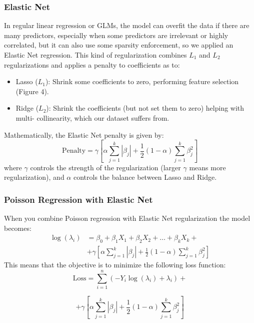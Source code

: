 \documentclass[a4paper, 11pt]{article}
\begin{document}
\begin{multicols}{2}
{\subsubsection*{Elastic Net}
In regular linear regression or GLMs, the model can overfit the data if there are many predictors, especially when some predictors are irrelevant or highly correlated, but it can also use some sparsity enforcement, so we applied an Elastic Net regression. This kind of regularization combines $L_1$ and $L_2$ regularizations and applies a penalty to coefficients as to:
\begin{itemize}
    \item Lasso ($L_1$): Shrink some coefficients to
    zero, performing feature selection (Figure 4).
    \item Ridge ($L_2$): Shrink the coefficients (but
    not set them to zero) helping with multi-
    collinearity, which our dataset suffers from.
\end{itemize}
Mathematically, the Elastic Net penalty is given by:
\begin{equation}
\text{Penalty}= \gamma \left[\alpha \sum_{j=1}^k|\beta_j| + \frac{1}{2}(1-\alpha)\sum_{j=1}^k\beta_{j}^{2} \right]
\end{equation} 
where $\gamma$ controls the strength of the regularization (larger $\gamma$ means more regularization), and $\alpha$ controls the balance between Lasso and Ridge.

\subsubsection*{Poisson Regression with Elastic Net}
When you combine Poisson regression with Elastic Net regularization the model becomes:
\begin{equation}
\begin{split}
\log(\lambda_i)&=\beta_0+\beta_1X_1+\beta_2X_2+\dots+\beta_kX_k+ \\
&+\gamma \left[\alpha \sum_{j=1}^k|\beta_j| + \frac{1}{2}(1-\alpha)\sum_{j=1}^k\beta_{j}^{2} \right]
\end{split}
\end{equation}
This means that the objective is to minimize the following loss function:
\begin{equation*}
\text{Loss} = \sum_{i=1}^n \left( -Y_i \log(\lambda_i) + \lambda_i \right) +
\end{equation*}

\begin{equation*}
+ \gamma \left[ \alpha \sum_{j=1}^k |\beta_j| + \frac{1}{2}(1-\alpha) \sum_{j=1}^k \beta_{j}^{2} \right]
\end{equation*}


}
\end{multicols}
\end{document}
